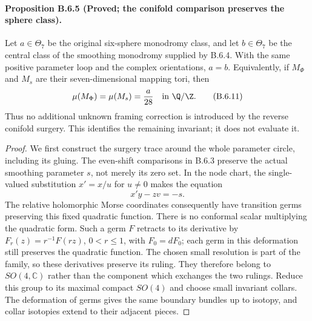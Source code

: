 \paragraph{Proposition B.6.5 (Proved; the conifold comparison preserves the sphere class).}
Let $a\in\Theta_7$ be the original six-sphere monodromy class,
and let $b\in\Theta_7$ be the central class of the smoothing
monodromy supplied by B.6.4. With the same positive parameter
loop and the complex orientations, $a=b$. Equivalently, if
$M_\Phi$ and $M_s$ are their seven-dimensional mapping tori, then
\[
 \mu(M_\Phi)=\mu(M_s)=\frac{a}{28}\quad\hbox{in }\Q/\Z.
 \tag{B.6.11}
\]
Thus no additional unknown framing correction is introduced by
the reverse conifold surgery. This identifies the remaining
invariant; it does not evaluate it.

\begin{proof}
We first construct the surgery trace around the whole parameter
circle, including its gluing. The even-shift comparisons in B.6.3
preserve the actual smoothing parameter $s$, not merely its zero
set. In the node chart, the single-valued substitution $x'=x/u$
for $u\ne0$ makes the equation
\[
 x'y-zv=-s.
\]
The relative holomorphic Morse coordinates consequently have
transition germs preserving this fixed quadratic function.
There is no conformal scalar multiplying the quadratic form.
Such a germ $F$ retracts to its derivative by
$F_r(z)=r^{-1}F(rz)$, $0<r\leq1$, with $F_0=dF_0$;
each germ in this deformation still preserves the quadratic
function. The chosen small resolution is part of the family,
so these derivatives preserve its ruling. They therefore belong
to $SO(4,\mathbb C)$ rather than the component which exchanges
the two rulings. Reduce this group to its maximal compact
$SO(4)$ and choose small invariant collars. The deformation of
germs gives the same boundary bundles up to isotopy, and collar
isotopies extend to their adjacent pieces.


\end{proof}
